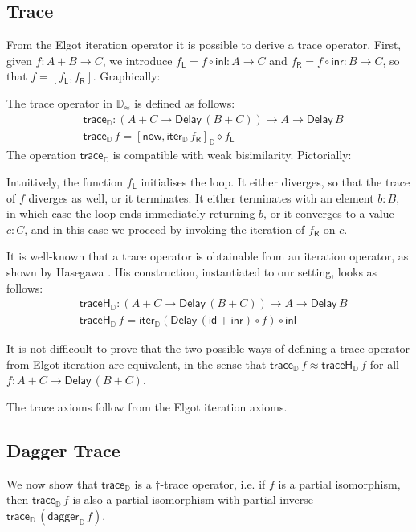 \documentclass[runningheads,a4paper]{llncs}
\newcommand{\comp}{\circ}
\newcommand{\inl}{\mathsf{inl}}
\newcommand{\inr}{\mathsf{inr}}
\newcommand{\mapL}[1]{#1_{\mathsf{L}}}
\newcommand{\mapR}[1]{#1_{\mathsf{R}}}
\newcommand{\id}{\mathsf{id}}
\newcommand{\Delay}{\ensuremath{\mathsf{Delay}\,}}
\newcommand{\now}{\mathsf{now}}
\newcommand{\D}{\mathbb{D}}
\newcommand{\Dapprox}{\mathbb{D}_{\approx}}
\newcommand{\copairD}[2]{[#1,#2]_{\D}}
\newcommand{\iterD}{\mathsf{iter}_\D}
\newcommand{\traceD}{\mathsf{trace}_\D}
\newcommand{\traceHD}{\mathsf{traceH}_\D}
\newcommand{\daggerD}{\mathsf{dagger}_\D}
\begin{document}
\subsection{Trace}\label{sec:trace}

From the Elgot iteration operator it is possible to derive a trace
operator. First, given $f : A + B \to C$, we introduce
$\mapL f = f \comp \inl : A \to C$ and
$\mapR f = f \comp \inr : B \to C$, so that $f = [\mapL f , \mapR f]$.
Graphically:
 
The trace operator in $\Dapprox$ is defined as follows:
\begin{align*}
& \traceD : (A + C \to \Delay (B + C)) \to A \to \Delay B \\
& \traceD \,f = \copairD{\now}{\iterD \,\mapR f}\diamond \mapL f
\end{align*}
The operation $\traceD$ is compatible with weak bisimilarity. 
Pictorially:


Intuitively, the function $\mapL f$ initialises the loop. It either
diverges, so that the trace of $f$ diverges as well, or it terminates. It either terminates with
an element $b : B$, in which case the loop ends immediately returning
$b$, or it converges to a value $c : C$, and in this case we proceed
by  invoking the iteration of $\mapR f$ on $c$.

It is well-known that a trace operator is obtainable from an iteration
operator, as shown by Hasegawa  \cite{Hasegawa97}. His construction,
instantiated to our setting, looks as follows:
\begin{align*}
& \traceHD : (A + C \to \Delay (B + C)) \to A \to \Delay B \\
& \traceHD \,f = \iterD (\Delay (\id + \inr) \comp f) \comp \inl
\end{align*}

It is not difficoult to prove that the two possible ways of defining a
trace operator from Elgot iteration are equivalent, in the sense that
$\traceD\,f \approx \traceHD\,f$ for all $f : A + C \to \Delay (B +
C)$. 

The trace axioms follow from the Elgot iteration axioms.

\subsection{Dagger Trace}\label{sec:daggertrace}

We now show that $\traceD$ is a $\dagger$-trace operator,
i.e. if $f$ is a partial isomorphism, then
$\traceD\,f$ is also a partial isomorphism with partial inverse $\traceD\,(\daggerD\,f)$.
\end{document}

